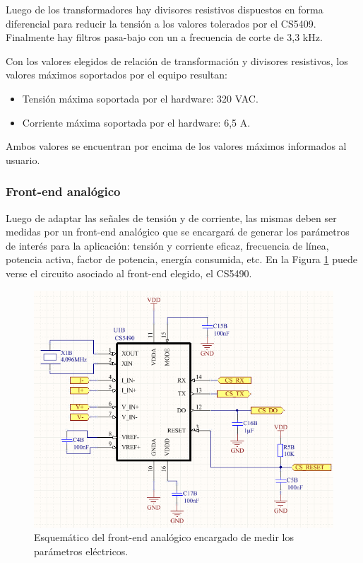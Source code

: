 Luego de los transformadores hay divisores resistivos dispuestos en forma diferencial para reducir la tensión a los valores tolerados por el CS5409. Finalmente hay filtros pasa-bajo con un a frecuencia de corte de 3,3 kHz.

Con los valores elegidos de relación de transformación y divisores resistivos, los valores máximos soportados por el equipo resultan:

\begin{itemize}
\item Tensión máxima soportada por el hardware: 320 VAC.
\item Corriente máxima soportada por el hardware: 6,5 A.
\end{itemize}

Ambos valores se encuentran por encima de los valores máximos informados al usuario.


\subsubsection{Front-end analógico}

Luego de adaptar las señales de tensión y de corriente, las mismas deben ser medidas por un front-end analógico que se encargará de generar los parámetros de interés para la aplicación: tensión y corriente eficaz, frecuencia de línea, potencia activa, factor de potencia, energía consumida, etc. En la Figura \ref{fig:pcb_medicion_energia} puede verse el circuito asociado al front-end elegido, el CS5490.

\begin{figure}[h]
	\centering
	\includegraphics[width=14cm]{./Figures/3_1_2_pcb_medicion_energia.png}
	\caption{Esquemático del front-end analógico encargado de medir los parámetros eléctricos.}
	\label{fig:pcb_medicion_energia}
\end{figure}


